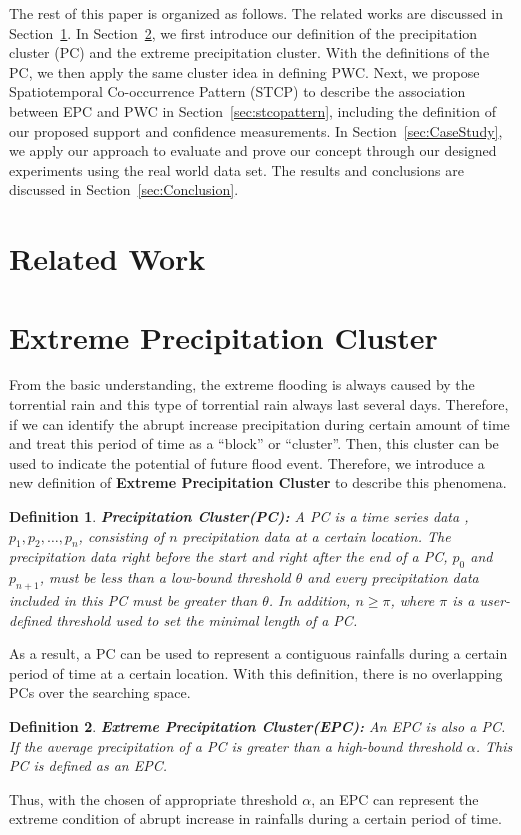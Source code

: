 \documentclass{acm_proc_article-sp}
\begin{document}
 The rest of this paper is organized as follows. The related works are
discussed in Section~\ref{sec:relatedwork}. In Section~\ref{sec:EPC}, we first
introduce our definition of the precipitation cluster (PC) and the
extreme precipitation cluster. With the definitions of the PC, we then apply the
same cluster idea in defining PWC. Next, we propose Spatiotemporal
Co-occurrence Pattern (STCP) to describe the association between EPC and PWC in
Section~\ref{sec:stcopattern}, including the definition of our proposed
support and confidence measurements. In Section~\ref{sec:CaseStudy}, we
apply our approach to evaluate and prove our concept through our designed
experiments using the real world data set. The results and conclusions are
discussed in Section~\ref{sec:Conclusion}.
\section{Related Work}
\label{sec:relatedwork}

\section{Extreme Precipitation Cluster}
\label{sec:EPC}
\newtheorem{mydef}{Definition}
From the basic understanding, the extreme flooding is always caused by the
torrential rain and this type of torrential rain always last several days.
Therefore, if we can identify the abrupt increase precipitation during certain
amount of time and treat this period of time as a ``block'' or ``cluster''.
Then, this cluster can be used to indicate the potential of future flood event.
Therefore, we introduce a new definition of \textbf{Extreme Precipitation
Cluster} to describe this phenomena.
\begin{mydef} 
\label{def:PC}
\textbf{Precipitation Cluster(PC):} A PC is a time series data , $p_1 , p_2 ,
\ldots , p_n $, consisting of $n$ precipitation data at a certain location. The
precipitation data right before the start and right after the end of a PC, $p_0$
and $p_{n+1}$, must be less than a low-bound threshold $\theta$ and every
precipitation data included in this PC must be greater than $\theta$. In
addition, $n \geq \pi $, where $\pi $ is a user-defined threshold used to set
the minimal length of a PC.
\end{mydef} 
As a result, a PC can be used to represent a contiguous rainfalls during a
certain period of time at a certain location. With this definition, there is
no overlapping PCs over the searching space.
\begin{mydef}
\label{def:EPC}
\textbf{Extreme Precipitation Cluster(EPC):} An EPC is also a PC. If the
average precipitation of a PC is greater than a high-bound threshold $\alpha$. This PC is
defined as an EPC.
\end{mydef} 
Thus, with the chosen of appropriate threshold $\alpha$, an EPC can represent the extreme condition of abrupt increase in rainfalls during a certain period of time.
\end{document}
